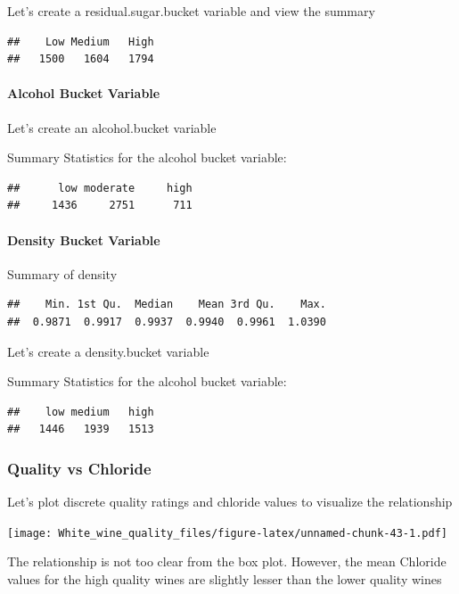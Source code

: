 \documentclass[]{article}
\let\oldparagraph\paragraph
\renewcommand{\paragraph}[1]{\oldparagraph{#1}\mbox{}}
\begin{document}
Let's create a residual.sugar.bucket variable and view the summary

\begin{verbatim}
##    Low Medium   High 
##   1500   1604   1794
\end{verbatim}

\paragraph{Alcohol Bucket Variable}\label{alcohol-bucket-variable}

Let's create an alcohol.bucket variable

Summary Statistics for the alcohol bucket variable:

\begin{verbatim}
##      low moderate     high 
##     1436     2751      711
\end{verbatim}

\paragraph{Density Bucket Variable}\label{density-bucket-variable}

Summary of density

\begin{verbatim}
##    Min. 1st Qu.  Median    Mean 3rd Qu.    Max. 
##  0.9871  0.9917  0.9937  0.9940  0.9961  1.0390
\end{verbatim}

Let's create a density.bucket variable

Summary Statistics for the alcohol bucket variable:

\begin{verbatim}
##    low medium   high 
##   1446   1939   1513
\end{verbatim}

\subsubsection{Quality vs Chloride}\label{quality-vs-chloride}

Let's plot discrete quality ratings and chloride values to visualize the
relationship

\texttt{[image: White\_wine\_quality\_files/figure-latex/unnamed-chunk-43-1.pdf]}

The relationship is not too clear from the box plot. However, the mean
Chloride values for the high quality wines are slightly lesser than the
lower quality wines
\end{document}

